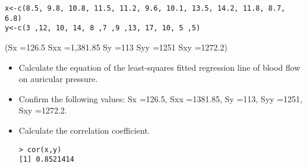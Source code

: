 \begin{verbatim}
x<-c(8.5, 9.8, 10.8, 11.5, 11.2, 9.6, 10.1, 13.5, 14.2, 11.8, 8.7, 6.8)
y<-c(3 ,12, 10, 14, 8 ,7 ,9 ,13, 17, 10, 5 ,5)
\end{verbatim}


(Sx =126.5 Sxx =1,381.85 Sy =113 Syy =1251 Sxy =1272.2)


\begin{itemize}
\item Calculate the equation of the least-squares fitted regression line of blood flow
on auricular pressure.
\item Confirm the following values: Sx =126.5, Sxx =1381.85, Sy =113, Syy =1251, Sxy =1272.2.
\item Calculate the correlation coefficient.

\begin{verbatim}
> cor(x,y)
[1] 0.8521414
\end{verbatim}
\end{itemize}


